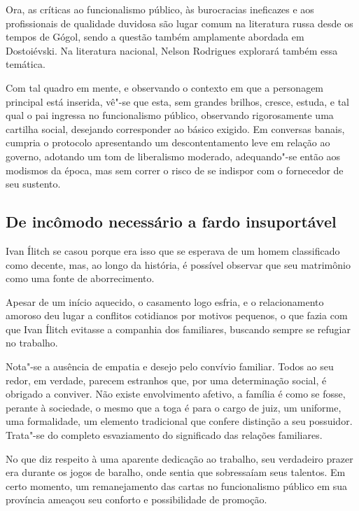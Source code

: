 \documentclass[12pt]{extarticle}
\begin{document}


Ora, as críticas ao funcionalismo público, às burocracias ineficazes e
aos profissionais de qualidade duvidosa são lugar comum na literatura
russa desde os tempos de Gógol, sendo a questão também amplamente
abordada em Dostoiévski. Na literatura nacional, Nelson Rodrigues
explorará também essa temática.

Com tal quadro em mente, e observando o contexto em que a personagem
principal está inserida, vê"-se que esta, sem grandes brilhos, cresce, 
estuda, e tal qual o pai ingressa no funcionalismo
público, observando rigorosamente uma cartilha social, desejando 
corresponder ao básico exigido. Em conversas banais, cumpria o protocolo
apresentando um descontentamento leve em relação ao governo, adotando um
tom de liberalismo moderado, adequando"-se então aos modismos da época,
mas sem correr o risco de se indispor com o fornecedor de seu sustento.


\subsection{De incômodo necessário a fardo insuportável}

Ivan Ílitch se casou porque era isso que se esperava de um homem
classificado como decente, mas, ao longo da história, é possível observar que seu
matrimônio como uma fonte de aborrecimento.

Apesar de um início aquecido, o casamento logo esfria, e o
relacionamento amoroso deu lugar a conflitos cotidianos por motivos
pequenos, o que fazia com que Ivan Ílitch evitasse a companhia dos
familiares, buscando sempre se refugiar no trabalho.

Nota"-se a ausência de empatia e desejo pelo convívio familiar. Todos
ao seu redor, em verdade, parecem estranhos que, por uma determinação
social, é obrigado a conviver. Não existe envolvimento afetivo, a
família é como se fosse, perante à sociedade, o mesmo que a toga é para
o cargo de juiz, um uniforme, uma formalidade, um elemento tradicional
que confere distinção a seu possuidor. Trata"-se do completo 
esvaziamento do significado das relações
familiares.

No que diz respeito à uma aparente dedicação ao trabalho, seu
verdadeiro prazer era durante os jogos de baralho, onde sentia que 
sobressaíam seus talentos. Em certo momento, um remanejamento 
das cartas no funcionalismo público em sua
província ameaçou seu conforto e possibilidade de promoção.
\end{document}
